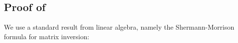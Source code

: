



\subsection{Proof of }
We use a standard result from linear algebra, 
namely the Shermann-Morrison formula 
\citep{sherman1950adjustment} for matrix inversion:  

